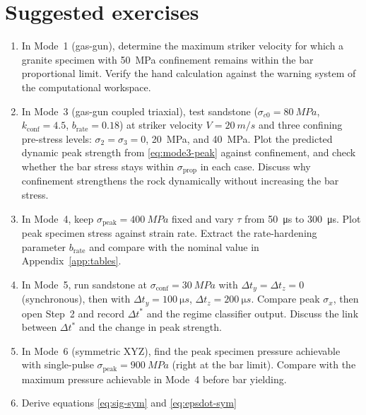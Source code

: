 \documentclass[11pt,a4paper,openany]{book}
\providecommand{\SI}[2]{\qty{#1}{#2}}
\theoremstyle{handbook}
\newcommand{\sig}{\sigma}
\newcommand{\sigprop}{\sig_{\text{prop}}}
\newcommand{\sigpeak}{\sig_{\text{peak}}}
\begin{document}
\chapter{Suggested exercises}\label{app:exercises}

\begin{enumerate}[leftmargin=*,itemsep=4pt]
  \item In Mode~1 (gas-gun), determine the maximum striker velocity for
        which a granite specimen with \SI{50}{MPa} confinement remains
        within the bar proportional limit. Verify the hand calculation
        against the warning system of the computational workspace.
  \item In Mode~3 (gas-gun coupled triaxial), test sandstone
        ($\sig_{c0}=\SI{80}{MPa}$, $k_{\text{conf}}=4.5$,
        $b_{\text{rate}}=0.18$) at striker velocity $V=\SI{20}{m/s}$ and
        three confining pre-stress levels: $\sig_2=\sig_3=0$,
        \SI{20}{MPa}, and \SI{40}{MPa}. Plot the predicted dynamic peak
        strength from \eqref{eq:mode3-peak} against confinement, and check
        whether the bar stress stays within $\sigprop$ in each case.
        Discuss why confinement strengthens the rock dynamically without
        increasing the bar stress.
  \item In Mode~4, keep $\sigpeak=\SI{400}{MPa}$ fixed and vary $\tau$ from
        \SI{50}{\micro s} to \SI{300}{\micro s}. Plot peak specimen stress
        against strain rate. Extract the rate-hardening parameter
        $b_{\text{rate}}$ and compare with the nominal value in
        Appendix~\ref{app:tables}.
  \item In Mode~5, run sandstone at $\sig_{\text{conf}}=\SI{30}{MPa}$ with
        $\Delta t_y=\Delta t_z=0$ (synchronous), then with
        $\Delta t_y=\SI{100}{\micro s}$, $\Delta t_z=\SI{200}{\micro s}$.
        Compare peak $\sig_x$, then open Step~2 and record
        $\Delta t^{\ast}$ and the regime classifier output. Discuss the
        link between $\Delta t^{\ast}$ and the change in peak strength.
  \item In Mode~6 (symmetric XYZ), find the peak specimen pressure
        achievable with single-pulse $\sigpeak=\SI{900}{MPa}$ (right at
        the bar limit). Compare with the maximum pressure achievable in
        Mode~4 before bar yielding.
  \item Derive equations \eqref{eq:sig-sym} and \eqref{eq:epsdot-sym}

\end{enumerate}
\end{document}
